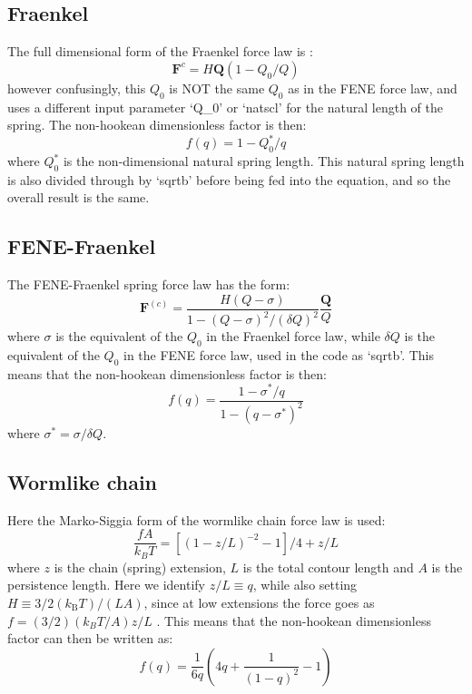 \documentclass{article}
\begin{document}
\subsection{Fraenkel}
The full dimensional form of the Fraenkel force law is \cite{Bird1987}:
\begin{equation}
    \bm{F}^{c} = H \bm{Q} (1-Q_0/Q)
\end{equation}
however confusingly, this $Q_0$ is NOT the same $Q_0$ as in the FENE force law, and uses a different input parameter `Q\_0' or `natscl' for the natural length of the spring.
The non-hookean dimensionless factor is then:
\begin{equation}
    f(q) = {1-Q_0^*/q}
\end{equation}
where $Q_0^*$ is the non-dimensional natural spring length. This natural spring length is also divided through by `sqrtb' before being fed into the equation, and so the overall result is the same.

\subsection{FENE-Fraenkel}
The FENE-Fraenkel spring force law has the form:
\begin{equation}
    \bm{F}^{(c)} = \frac{H(Q-\sigma)}{1-(Q-\sigma)^2/(\delta Q)^2} \frac{\bm{Q}}{Q}
\label{FF_force_eqn}
\end{equation}
where $\sigma$ is the equivalent of the $Q_0$ in the Fraenkel force law, while $\delta Q$ is the equivalent of the $Q_0$ in the FENE force law, used in the code as `sqrtb'. 
This means that the non-hookean dimensionless factor is then:
\begin{equation}
    f(q) = \frac{1-\sigma^*/q}{1-(q-\sigma^*)^2}
\end{equation}
where $\sigma^* = \sigma/\delta Q$.

\subsection{Wormlike chain}
Here the Marko-Siggia form \cite{marko1995statistical} of the wormlike chain force law is used:
\begin{equation}
    \frac{f A}{k_{B} T}=\left[(1-z / L)^{-2}-1\right] / 4+z / L
\end{equation}
where $z$ is the chain (spring) extension, $L$ is the total contour length and $A$ is the persistence length.
Here we identify $z/L \equiv q$, while also setting $H \equiv 3/2 (k_\mathrm{B} T)/(L A)$, since at low extensions the force goes as $f=(3 / 2)\left(k_{B} T / A\right) z / L$ \cite{marko1995statistical}.
This means that the non-hookean dimensionless factor can then be written as:
\begin{equation}
    f(q) = \frac{1}{6q} \left( 4q + \frac{1}{(1-q)^2} -1\right)
\end{equation}
\end{document}
